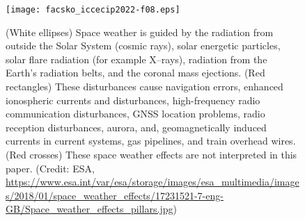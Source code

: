 \documentclass[sn-aps]{sn-jnl}%
\begin{document}

\begin{figure}[!t]
\centering
\texttt{[image: facsko\_iccecip2022-f08.eps]}
\caption{(White ellipses) Space weather is guided by the radiation from outside the Solar System (cosmic rays), solar energetic particles, solar flare radiation (for example X--rays), radiation from the Earth's radiation belts, and the coronal mass ejections. (Red rectangles) These disturbances cause navigation errors, enhanced ionospheric currents and disturbances, high-frequency radio communication disturbances, GNSS location problems, radio reception disturbances, aurora, and, geomagnetically induced currents in current systems, gas pipelines, and train overhead wires. (Red crosses) These space weather effects are not interpreted in this paper. (Credit: ESA, \url{https://www.esa.int/var/esa/storage/images/esa_multimedia/images/2018/01/space_weather_effects/17231521-7-eng-GB/Space_weather_effects_pillars.jpg})} \label{fig:sweffects}
\end{figure}
\end{document}
